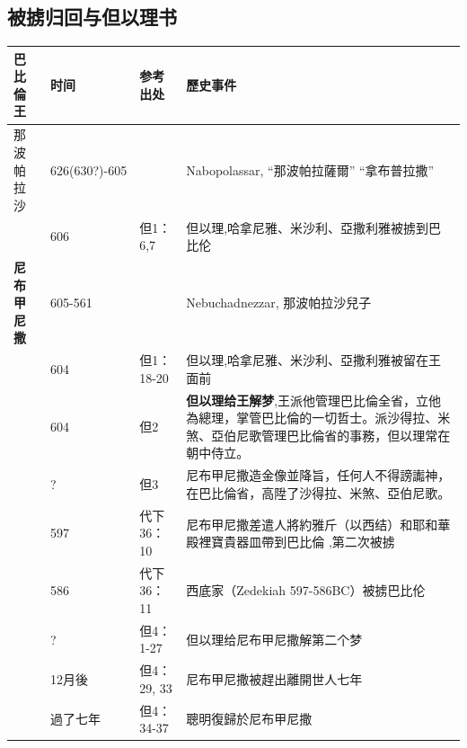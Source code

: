 \subsection{被掳归回与但以理书}
\begin{table}[!hbp]
\centering 
\begin{tabular}{|p{2.8cm}|p{1.5cm}|p{2.5cm}|p{8.5cm}| }
\hline
\hline
巴比倫王 &  时间 &参考出处 & 歷史事件   \\\hline
那波帕拉沙 & 626(630?)-605& \cite{Nabopolassar}   &Nabopolassar, “那波帕拉薩爾” “拿布普拉撒” \\\hline

&606 & 但1：6,7&但以理,哈拿尼雅、米沙利、亞撒利雅被掳到巴比伦 \\\hline
\textbf{尼布甲尼撒}& 605-561&  &Nebuchadnezzar, 那波帕拉沙兒子 \\\hline
&604 & 但1：18-20&但以理,哈拿尼雅、米沙利、亞撒利雅被留在王面前  \\\hline
&604 & 但2& \textcolor[rgb]{0,.1,1}{\textbf{但以理给王解梦}},王派他管理巴比倫全省，立他為總理，掌管巴比倫的一切哲士。派沙得拉、米煞、亞伯尼歌管理巴比倫省的事務，但以理常在朝中侍立。  \\\hline
&?  &  但3& 尼布甲尼撒造金像並降旨，任何人不得謗讟神，在巴比倫省，高陞了沙得拉、米煞、亞伯尼歌。  \\\hline
& 597 &  代下36：10& 尼布甲尼撒差遣人將約雅斤（以西结）和耶和華殿裡寶貴器皿帶到巴比倫 ,第二次被掳 \\\hline
&586 & 代下36：11& 西底家（Zedekiah 597-586BC）被掳巴比伦\\\hline
& ? &但4：1-27& 但以理给尼布甲尼撒解第二个梦  \\\hline
&12月後 &  但4：29, 33& 尼布甲尼撒被趕出離開世人七年  \\\hline
&過了七年 &  但4：34-37& 聰明復歸於尼布甲尼撒 \\\hline


\end{tabular}
\end{table}
